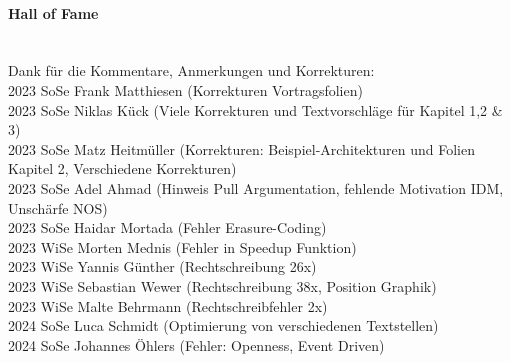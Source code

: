 \documentclass[a4paper,10pt]{book}
\begin{document}
\paragraph{Hall of Fame}
\mbox{}\\
Dank für die Kommentare, Anmerkungen und Korrekturen:  \\
2023 SoSe Frank Matthiesen (Korrekturen Vortragsfolien) \\
2023 SoSe Niklas Kück (Viele Korrekturen und Textvorschläge für Kapitel 1,2 \& 3)\\
2023 SoSe Matz Heitmüller (Korrekturen: Beispiel-Architekturen und Folien Kapitel 2, Verschiedene Korrekturen) \\
2023 SoSe Adel Ahmad (Hinweis Pull Argumentation, fehlende Motivation IDM, Unschärfe NOS) \\
2023 SoSe Haidar Mortada (Fehler  Erasure-Coding) \\
2023 WiSe Morten Mednis (Fehler in Speedup Funktion) \\
2023 WiSe Yannis Günther (Rechtschreibung 26x) \\
2023 WiSe Sebastian Wewer (Rechtschreibung 38x, Position Graphik) \\
2023 WiSe Malte Behrmann (Rechtschreibfehler 2x)\\
2024 SoSe Luca Schmidt (Optimierung von verschiedenen Textstellen) \\
2024 SoSe Johannes Öhlers (Fehler: Openness, Event Driven)\\
\\
\tableofcontents
\newpage

\newpage

\newpage

\newpage


\newpage


\newpage


\newpage




\renewcommand{\indexname}{Stichwortverzeichnis}
\printindex
\newpage
\printbibliography
\end{document}
